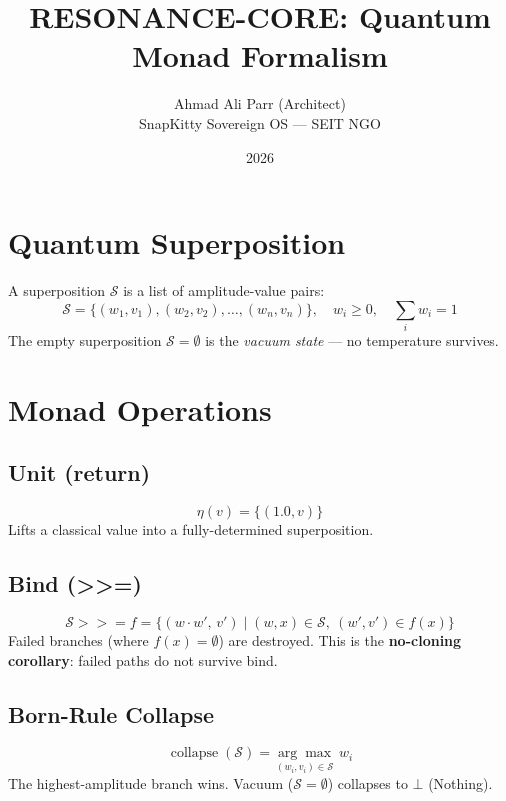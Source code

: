 \documentclass{article}
\title{RESONANCE-CORE: Quantum Monad Formalism}
\author{Ahmad Ali Parr (Architect) \\ SnapKitty Sovereign OS --- SEIT NGO}
\date{2026}
\begin{document}
\maketitle

\section{Quantum Superposition}
A superposition $\mathcal{S}$ is a list of amplitude-value pairs:
\begin{equation}
  \mathcal{S} = \{(w_1, v_1), (w_2, v_2), \ldots, (w_n, v_n)\}, \quad w_i \geq 0, \quad \sum_i w_i = 1
\end{equation}
The empty superposition $\mathcal{S} = \emptyset$ is the \emph{vacuum state} --- no temperature survives.

\section{Monad Operations}

\subsection{Unit (return)}
\begin{equation}
  \eta(v) = \{(1.0, v)\}
\end{equation}
Lifts a classical value into a fully-determined superposition.

\subsection{Bind (>>=)}
\begin{equation}
  \mathcal{S} \mathbin{>\!\!>=} f = \{(w \cdot w',\, v') \mid (w, x) \in \mathcal{S},\ (w', v') \in f(x)\}
\end{equation}
Failed branches (where $f(x) = \emptyset$) are destroyed. This is the \textbf{no-cloning corollary}: failed paths do not survive bind.

\subsection{Born-Rule Collapse}
\begin{equation}
  \operatorname{collapse}(\mathcal{S}) = \underset{(w_i, v_i) \in \mathcal{S}}{\arg\max}\; w_i
\end{equation}
The highest-amplitude branch wins. Vacuum ($\mathcal{S} = \emptyset$) collapses to $\bot$ (Nothing).
\end{document}
